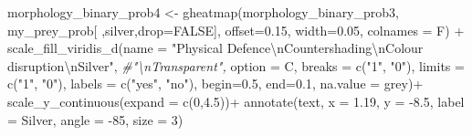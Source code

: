 \documentclass[
]{article}
\newenvironment{Shaded}{\begin{snugshade}}{\end{snugshade}}
\newcommand{\AttributeTok}[1]{\textcolor[rgb]{0.77,0.63,0.00}{#1}}
\newcommand{\CommentTok}[1]{\textcolor[rgb]{0.56,0.35,0.01}{\textit{#1}}}
\newcommand{\ConstantTok}[1]{\textcolor[rgb]{0.00,0.00,0.00}{#1}}
\newcommand{\DecValTok}[1]{\textcolor[rgb]{0.00,0.00,0.81}{#1}}
\newcommand{\FloatTok}[1]{\textcolor[rgb]{0.00,0.00,0.81}{#1}}
\newcommand{\FunctionTok}[1]{\textcolor[rgb]{0.00,0.00,0.00}{#1}}
\newcommand{\NormalTok}[1]{#1}
\newcommand{\OtherTok}[1]{\textcolor[rgb]{0.56,0.35,0.01}{#1}}
\newcommand{\SpecialCharTok}[1]{\textcolor[rgb]{0.00,0.00,0.00}{#1}}
\newcommand{\StringTok}[1]{\textcolor[rgb]{0.31,0.60,0.02}{#1}}
\begin{document}
\begin{Shaded}
\begin{Highlighting}[]
\NormalTok{morphology\_binary\_prob4 }\OtherTok{\textless{}{-}} \FunctionTok{gheatmap}\NormalTok{(morphology\_binary\_prob3, my\_prey\_prob[ ,}\StringTok{\textquotesingle{}silver\textquotesingle{}}\NormalTok{,}\AttributeTok{drop=}\ConstantTok{FALSE}\NormalTok{], }
                                    \AttributeTok{offset=}\FloatTok{0.15}\NormalTok{, }\AttributeTok{width=}\FloatTok{0.05}\NormalTok{, }\AttributeTok{colnames =}\NormalTok{ F) }\SpecialCharTok{+}
  \FunctionTok{scale\_fill\_viridis\_d}\NormalTok{(}\AttributeTok{name =} \StringTok{"Physical Defence}\SpecialCharTok{\textbackslash{}n}\StringTok{Countershading}\SpecialCharTok{\textbackslash{}n}\StringTok{Colour disruption}\SpecialCharTok{\textbackslash{}n}\StringTok{Silver"}\NormalTok{, }\CommentTok{\#"\textbackslash{}nTransparent", }
                       \AttributeTok{option =} \StringTok{\textquotesingle{}C\textquotesingle{}}\NormalTok{,}
                       \AttributeTok{breaks =} \FunctionTok{c}\NormalTok{(}\StringTok{"1"}\NormalTok{, }\StringTok{"0"}\NormalTok{),}
                       \AttributeTok{limits =} \FunctionTok{c}\NormalTok{(}\StringTok{"1"}\NormalTok{, }\StringTok{"0"}\NormalTok{),}
                       \AttributeTok{labels =} \FunctionTok{c}\NormalTok{(}\StringTok{"yes"}\NormalTok{, }\StringTok{"no"}\NormalTok{),}
                       \AttributeTok{begin=}\FloatTok{0.5}\NormalTok{, }\AttributeTok{end=}\FloatTok{0.1}\NormalTok{, }
                       \AttributeTok{na.value =} \StringTok{\textquotesingle{}grey\textquotesingle{}}\NormalTok{)}\SpecialCharTok{+}
  \FunctionTok{scale\_y\_continuous}\NormalTok{(}\AttributeTok{expand =} \FunctionTok{c}\NormalTok{(}\DecValTok{0}\NormalTok{,}\FloatTok{4.5}\NormalTok{))}\SpecialCharTok{+}
  \FunctionTok{annotate}\NormalTok{(}\StringTok{\textquotesingle{}text\textquotesingle{}}\NormalTok{, }\AttributeTok{x =} \FloatTok{1.19}\NormalTok{, }\AttributeTok{y =} \SpecialCharTok{{-}}\FloatTok{8.5}\NormalTok{, }\AttributeTok{label =} \StringTok{\textquotesingle{}Silver\textquotesingle{}}\NormalTok{, }\AttributeTok{angle =} \SpecialCharTok{{-}}\DecValTok{85}\NormalTok{, }\AttributeTok{size =} \DecValTok{3}\NormalTok{)}


\end{Highlighting}
\end{Shaded}
\end{document}
